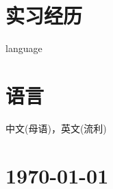\documentclass{article}
\begin{document}




\section*{实习经历}
\indent





language
\section*{语言}
\indent

中文(母语)，英文(流利)


\vfill

\section*{\hfill\color{OliveGreen}\today}
\end{document}
